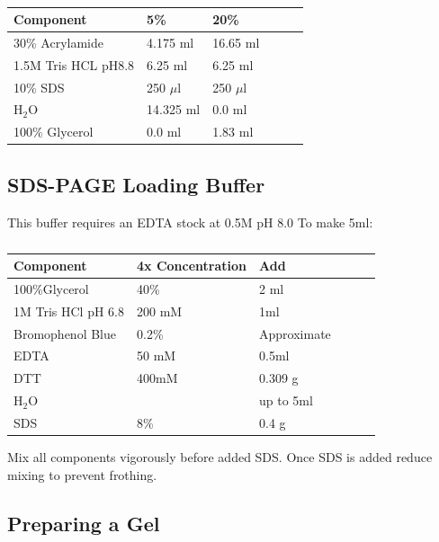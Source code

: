 \documentclass{tufte-book} %
\begin{document}
\begin{table}[ht]
  \centering
  \selectfont
  \begin{tabular}{llllll}
    \toprule
    Component & 5\% & 20\% \\
    \midrule
   30\% Acrylamide			& 4.175 ml &	16.65 ml \\
   1.5M Tris HCL pH8.8 	& 6.25 ml	& 6.25 ml	\\
   10\% SDS			& 250 $\mu$l	& 250 $\mu$l	\\
    H$_{2}$O 			& 14.325 ml	& 0.0 ml\\
    100\% Glycerol			& 0.0 ml	& 1.83 ml \\

    \bottomrule
  \end{tabular}
  \caption{}
  \label{tab:res}
\end{table}

\subsection{SDS-PAGE Loading Buffer}

This buffer requires an EDTA stock at 0.5M pH 8.0
To make 5ml:

\begin{table}[ht]
  \centering
  \selectfont
  \begin{tabular}{llllll}
    \toprule
    Component & 4x Concentration & Add \\
    \midrule
   100\%Glycerol 		& 40\% 		& 2 ml		\\
   1M Tris HCl pH 6.8		& 200 mM		& 1ml		\\
   Bromophenol Blue		& 0.2\%		& Approximate	\\
   EDTA				& 50 mM		& 0.5ml		\\
   DTT				& 400mM		& 0.309 g		\\
    H$_{2}$O 			& 			& up to 5ml	\\
    SDS				& 8\%		& 0.4 g		\\ 


    \bottomrule
  \end{tabular}
  \caption{}
  \label{tab:res}
\end{table}

Mix all components vigorously before added SDS. Once SDS is added reduce mixing to prevent frothing.

\subsection{Preparing a Gel}
\end{document}
